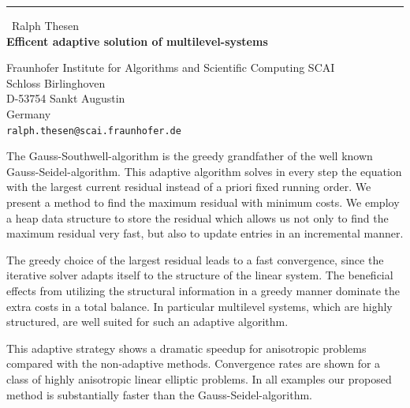 \documentclass{report}
\begin{document}
\begin{center}
\rule{6in}{1pt} \
{\large Ralph Thesen \\
{\bf Efficent adaptive solution of multilevel-systems}}

Fraunhofer Institute for Algorithms and Scientific Computing SCAI \\ Schloss Birlinghoven \\ D-53754 Sankt Augustin \\ Germany
\\
{\tt ralph.thesen@scai.fraunhofer.de}\end{center}

The Gauss-Southwell-algorithm is the greedy grandfather of the
well known Gauss-Seidel-algorithm. This adaptive algorithm solves
in every step the equation with the largest current residual
instead of a priori fixed running order. We present a method to
find the maximum residual with minimum costs. We employ a heap
data structure to store the residual which allows us not only to
find the maximum residual very fast, but also to update entries
in an incremental manner.

The greedy choice of the largest residual leads to a fast
convergence, since the iterative solver adapts itself to the
structure of the linear system. The beneficial effects from
utilizing the structural information in a greedy manner dominate
the extra costs in a total balance. In particular multilevel
systems, which are highly structured, are well suited for such an
adaptive algorithm.

This adaptive strategy shows a dramatic speedup for anisotropic
problems compared with the non-adaptive methods. Convergence
rates are shown for a class of highly anisotropic linear elliptic
problems. In all examples our proposed method is substantially
faster than the Gauss-Seidel-algorithm.
\end{document}
